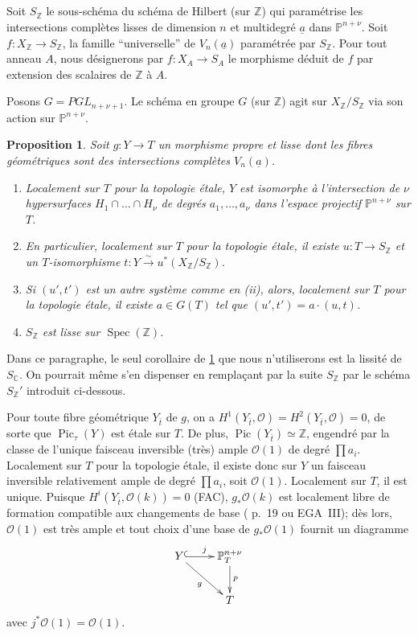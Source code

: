\documentclass[10pt,leqno]{amsart}
\theoremstyle{plain}
\newtheorem{proposition}[theorem]{Proposition}
\theoremstyle{definition}
\theoremstyle{remark}
\DeclareMathOperator{\Pic}{Pic}
\DeclareMathOperator{\Spec}{Spec}
\newcommand{\ZZ}{\mathbb{Z}}
\newcommand{\CC}{\mathbb{C}}
\newcommand{\PP}{\mathbb{P}}
\newcommand{\Oo}{\mathscr{O}}
\newcommand{\ua}{\underline{a}}
\begin{document}
\subsection{}\label{1.8}

Soit $S_\ZZ$ le sous-sch\'ema du sch\'ema de Hilbert (sur $\ZZ$) qui param\'etrise les intersections compl\`etes lisses de dimension $n$ et multidegr\'e $\ua$ dans $\PP^{n+\nu}$. Soit $f\colon X_\ZZ\to S_\ZZ$, la famille ``universelle'' de $V_n(\ua)$ param\'etr\'ee par $S_\ZZ$. Pour tout anneau $A$, nous d\'esignerons par $f\colon X_A\to S_A$ le morphisme d\'eduit de $f$ par extension des scalaires de $\ZZ$ \`a $A$.

Posons $G=PGL_{n+\nu+1}$. Le sch\'ema en groupe $G$ (sur $\ZZ$) agit sur $X_\ZZ/S_\ZZ$ via son action sur $\PP^{n+\nu}$.

\begin{proposition}\label{prop:1.9}
Soit $g\colon Y\to T$ un morphisme propre et lisse dont les fibres g\'eom\'etriques sont des intersections compl\`etes $V_n(\ua)$.
\begin{enumerate}
\item[(i)] Localement sur $T$ pour la topologie \'etale, $Y$ est isomorphe \`a l'intersection de $\nu$ hypersurfaces $H_1\cap\ldots\cap H_\nu$ de degr\'es $a_1,\ldots,a_\nu$ dans l'espace projectif $\PP^{n+\nu}$ sur $T$.
\item[(ii)] En particulier, localement sur $T$ pour la topologie \'etale, il existe $u\colon T\to S_\ZZ$ et un $T$-isomorphisme $t\colon Y\xrightarrow{\sim}u^*(X_\ZZ/S_\ZZ)$.
\item[(iii)] Si $(u',t')$ est un autre syst\`eme comme en \textup{(ii)}, alors, localement sur $T$ pour la topologie \'etale, il existe $a\in G(T)$ tel que $(u',t')=a\cdot(u,t)$.
\item[(iv)] $S_\ZZ$ est lisse sur $\Spec(\ZZ)$.
\end{enumerate}
\end{proposition}

Dans ce paragraphe, le seul corollaire de \ref{prop:1.9} que nous n'utiliserons est la lissit\'e de $S_\CC$. On pourrait m\^eme s'en dispenser en rempla\c{c}ant par la suite $S_\ZZ$ par le sch\'ema $S_\ZZ'$ introduit ci-dessous.

Pour toute fibre g\'eom\'etrique $Y_{\bar{t}}$ de $g$, on a $H^1(Y_{\bar{t}},\Oo)=H^2(Y_{\bar{t}},\Oo)=0$, de sorte que $\Pic_{\tau}(Y)$ est \'etale sur $T$. De plus, $\Pic(Y_{\bar{t}})\simeq\ZZ$, engendr\'e par la classe de l'unique faisceau inversible (tr\`es) ample $\Oo(1)$ de degr\'e $\prod a_i$. Localement sur $T$ pour la topologie \'etale, il existe donc sur $Y$ un faisceau inversible relativement ample de degr\'e $\prod a_i$, soit $\Oo(1)$. Localement sur $T$, il est unique. Puisque $H^i(Y_{\bar{t}},\Oo(k))=0$ (FAC), $g_*\Oo(k)$ est localement libre de formation compatible aux changements de base (\cite{9} p.~19 ou EGA~III); d\`es lors, $\Oo(1)$ est tr\`es ample et tout choix d'une base de $g_*\Oo(1)$ fournit un diagramme
\[
\xymatrix{
Y \ar@{^(->}[r]^{j} \ar[rd]_{g} & \PP^{n+\nu}_T \ar[d]^{p} \\
& T
}
\]
avec $j^*\Oo(1)=\Oo(1)$.
\end{document}
